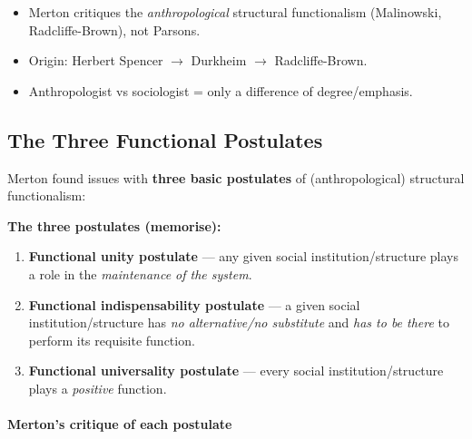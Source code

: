 \begin{QuickRevision}
\begin{itemize}
\item Merton critiques the \textit{anthropological} structural functionalism (Malinowski, Radcliffe-Brown), not Parsons.
\item Origin: Herbert Spencer $\rightarrow$ Durkheim $\rightarrow$ Radcliffe-Brown.
\item Anthropologist vs sociologist = only a difference of degree/emphasis.
\end{itemize}
\end{QuickRevision}

\sectiondivider

\subsection{The Three Functional Postulates}

Merton found issues with \textbf{three basic postulates} of (anthropological) structural functionalism:

\begin{DataFact}
\textbf{The three postulates (memorise):}
\begin{enumerate}
\item \textbf{Functional unity postulate} --- any given social institution/structure plays a role in the \textit{maintenance of the system}.
\item \textbf{Functional indispensability postulate} --- a given social institution/structure has \textit{no alternative/no substitute} and \textit{has to be there} to perform its requisite function.
\item \textbf{Functional universality postulate} --- every social institution/structure plays a \textit{positive} function.
\end{enumerate}
\end{DataFact}

\paragraph{Merton's critique of each postulate}

